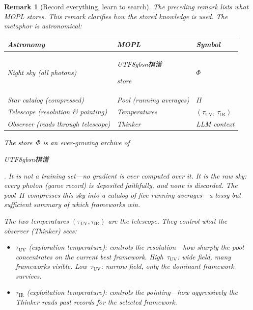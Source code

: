 \documentclass[11pt,a4paper]{article}
\newtheorem{remark}[theorem]{Remark}
\begin{document}
\begin{remark}[Record everything, learn to search]%
\label{rem:telescope}
\color{black!60}%
The preceding remark lists \emph{what} MOPL stores.
This remark clarifies \emph{how} the stored knowledge is used.
The metaphor is astronomical:

\begin{center}
\small
\begin{tabular}{@{}lll@{}}
\toprule
\textbf{Astronomy} & \textbf{MOPL} & \textbf{Symbol} \\
\midrule
Night sky (all photons) &
  \begin{CJK}{UTF8}{gbsn}棋谱\end{CJK} store &
  $\Phi$ \\
Star catalog (compressed) &
  Pool (running averages) &
  $\Pi$ \\
Telescope (resolution \& pointing) &
  Temperatures &
  $(\tau_{\text{UV}},\, \tau_{\text{IR}})$ \\
Observer (reads through telescope) &
  Thinker &
  LLM context \\
\bottomrule
\end{tabular}
\end{center}

\noindent
The store~$\Phi$ is an ever-growing archive of
\begin{CJK}{UTF8}{gbsn}棋谱\end{CJK}.
It is \emph{not} a training set---no gradient is ever
computed over it.
It is the raw sky: every photon (game record) is deposited
faithfully, and none is discarded.
The pool~$\Pi$ compresses this sky into a catalog of five
running averages---a lossy but sufficient summary of which
frameworks win.

\medskip\noindent
The two temperatures $(\tau_{\text{UV}}, \tau_{\text{IR}})$
are the \emph{telescope}.
They control what the observer (Thinker) sees:
\begin{itemize}
\item $\tau_{\text{UV}}$ (exploration temperature):
  controls the \emph{resolution}---how sharply the pool
  concentrates on the current best framework.
  High~$\tau_{\text{UV}}$: wide field, many frameworks
  visible.
  Low~$\tau_{\text{UV}}$: narrow field, only the dominant
  framework survives.
\item $\tau_{\text{IR}}$ (exploitation temperature):
  controls the \emph{pointing}---how aggressively the
  Thinker reads past records for the selected framework.
\end{itemize}


\end{remark}
\end{document}
